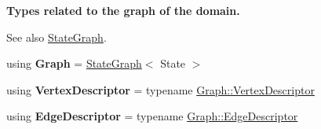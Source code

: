 \begin{Indent}{\bf Types related to the graph of the domain.}\par
{\em \begin{DoxySeeAlso}{See also}
\hyperlink{structslb_1_1core_1_1ui_1_1StateGraph}{State\+Graph}. 
\end{DoxySeeAlso}
}\begin{DoxyCompactItemize}
\item 
using {\bfseries Graph} = \hyperlink{structslb_1_1core_1_1ui_1_1StateGraph}{State\+Graph}$<$ State $>$\hypertarget{structslb_1_1core_1_1ui_1_1VisualEvent_ad64748dcc510f61fa61d942cf46bddce}{}\label{structslb_1_1core_1_1ui_1_1VisualEvent_ad64748dcc510f61fa61d942cf46bddce}

\item 
using {\bfseries Vertex\+Descriptor} = typename \hyperlink{structslb_1_1core_1_1ui_1_1StateGraph_ab2d88fce7d30dc6346910900212a7e6d}{Graph\+::\+Vertex\+Descriptor}\hypertarget{structslb_1_1core_1_1ui_1_1VisualEvent_ac1489810dc94c75f7ba32fa059ff91c9}{}\label{structslb_1_1core_1_1ui_1_1VisualEvent_ac1489810dc94c75f7ba32fa059ff91c9}

\item 
using {\bfseries Edge\+Descriptor} = typename \hyperlink{structslb_1_1core_1_1ui_1_1StateGraph_a7e894f002383b1687652a91549c3656d}{Graph\+::\+Edge\+Descriptor}\hypertarget{structslb_1_1core_1_1ui_1_1VisualEvent_a89171185113d003844bde2932b8119d6}{}\label{structslb_1_1core_1_1ui_1_1VisualEvent_a89171185113d003844bde2932b8119d6}

\end{DoxyCompactItemize}
\end{Indent}

